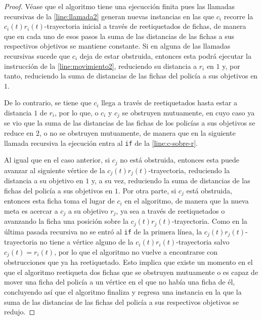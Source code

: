 \begin{proof}
    V\'ease que el algoritmo tiene una ejecucci\'on finita pues las llamadas
        recursivas de la \cref{line:llamada2} generan nuevas instancias en las
        que $c_i$ recorre la $c_i(t)r_i(t)$-trayectoria inicial a trav\'es de
        reetiquetados de fichas, de manera que en cada uno de esos pasos la suma
        de las distancias de las fichas a sus respectivos objetivos se mantiene
        constante. Si en alguna de las llamadas recursivas sucede que $c_i$ deja
        de estar obstruida, entonces esta podr\'a ejecutar la instrucci\'on de
        la \cref{line:movimiento2}, reduciendo su distancia a $r_i$ en $1$ y,
        por tanto, reduciendo la suma de distancias de las fichas del polic\'ia
        a sus objetivos en $1$.
        
        De lo contrario, se tiene que $c_i$ llega a trav\'es de reetiquetados
        hasta estar a distancia $1$ de $r_i$, por lo que, o $c_i$ y $c_j$ se
        obstruyen mutuamente, en cuyo caso ya se vio que la suma de las
        distancias de las fichas de los polic\'ias a sus objetivos se reduce en
        $2$, o no se obstruyen mutuamente, de manera que en la siguiente llamada
        recursiva la ejecuci\'on entra al \texttt{if} de la
        \cref{line:c-sobre-r}.
        
        Al igual que en el caso anterior, si $c_j$ no est\'a obstruida, entonces
        esta puede avanzar al siguiente v\'ertice de la
        $c_j(t)r_j(t)$-trayectoria, reduciendo la distancia a su objetivo en $1$
        y, a su vez, reduciendo la suma de distancias de las fichas del
        polic\'ia a sus objetivos en $1$. Por otra parte, si $c_j$ est\'a
        obstruida, entonces esta ficha toma el lugar de $c_i$ en el algoritmo,
        de manera que la nueva meta es acercar a $c_j$ a su objetivo $r_j$, ya
        sea a trav\'es de reetiquetados o avanzando la ficha una posici\'on
        sobre la $c_j(t)r_j(t)$-trayectoria. Como en la \'ultima pasada
        recursiva no se entr\'o al \texttt{if} de la primera l\'inea, la
        $c_j(t)r_j(t)$-trayectoria no tiene a v\'ertice alguno de la
        $c_i(t)r_i(t)$-trayectoria salvo $c_j(t)=r_i(t)$, por lo que el
        algoritmo no vuelve a encontrarse con obstrucciones que ya ha
        reetiquetado. Esto implica que existe un momento en el que el algoritmo
        reetiqueta dos fichas que se obstruyen mutuamente o es capaz de mover
        una ficha del polic\'ia a un v\'ertice en el que no hab\'ia una ficha de
        \'el, concluyendo as\'i que el algoritmo finaliza y regresa una
        instancia en la que la suma de las distancias de las fichas del
        polic\'ia a sus respectivos objetivos se redujo.

\end{proof}

